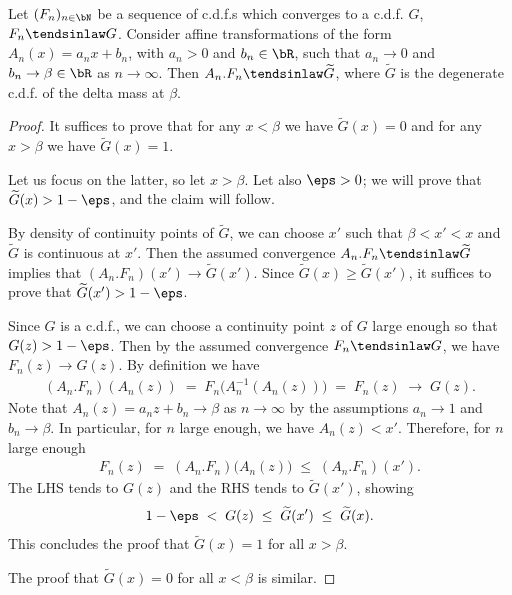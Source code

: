 \begin{lemma}
  \label{lem:degenerate-shrinking-limit}
  \leanok
  Let $(F_n)_{n \in \bN}$ be a sequence of c.d.f.s which converges to a c.d.f. $G$,
  $F_n \tendsinlaw G$. Consider affine transformations of the form $A_n(x) = a_n x + b_n$,
  with $a_n > 0$ and $b_n \in \bR$, such that $a_n \to 0$ and $b_n \to \beta \in \bR$
  as $n \to \infty$. Then $A_n . F_n \tendsinlaw \widetilde{G}$, where
  $\widetilde{G}$ is the degenerate c.d.f. of the delta mass at $\beta$.
\end{lemma}
\begin{proof}
  It suffices to prove that for any $x < \beta$ we have $\widetilde{G}(x) = 0$
  and for any $x > \beta$ we have $\widetilde{G}(x) = 1$.

  Let us focus on the latter, so let $x > \beta$. Let also $\eps > 0$; we will prove
  that $\widetilde{G}(x) > 1 - \eps$, and the claim will follow.

  By density of continuity points of $\widetilde{G}$, we can choose $x'$ such that
  $\beta < x' < x$ and $\widetilde{G}$ is continuous at $x'$. Then the assumed
  convergence $A_n . F_n \tendsinlaw \widetilde{G}$ implies that
  $(A_n . F_n)(x') \to \widetilde{G}(x')$. Since $\widetilde{G}(x) \ge \widetilde{G}(x')$,
  it suffices to prove that $\widetilde{G}(x') > 1 - \eps$.

  Since $G$ is a c.d.f., we can choose a continuity point $z$ of $G$
  large enough so that $G(z) > 1 - \eps$.
  Then by the assumed convergence $F_n \tendsinlaw G$, we have
  $F_n(z) \to G(z)$. By definition we have
  \begin{align*}
    (A_n . F_n)(A_n(z)) \; = \; F_n \big( A_n^{-1} (A_n(z)) \big) \; = \; F_n(z)
      \; \longrightarrow \; G(z) . %
  \end{align*}
  Note that $A_n(z) = a_n z + b_n \to \beta$ as $n \to \infty$ by the assumptions
  $a_n \to 1$ and $b_n \to \beta$. In particular, for $n$ large enough,
  we have $A_n(z) < x'$.
  Therefore, for $n$ large enough
  \begin{align*}
    F_n(z) \; = \; (A_n . F_n) \big( A_n(z) \big) \; \le \; (A_n . F_n)(x') .
  \end{align*}
  The LHS tends to $G(z)$ and the RHS tends to $\widetilde{G}(x')$,
  showing
  \begin{align*}
    1 - \eps \; < \; G(z) \; \le \; \widetilde{G}(x') \; \le \; \widetilde{G}(x) .
  \end{align*}
  This concludes the proof that $\widetilde{G}(x) = 1$ for all $x > \beta$.

  The proof that $\widetilde{G}(x) = 0$ for all $x < \beta$ is similar.
\end{proof}

